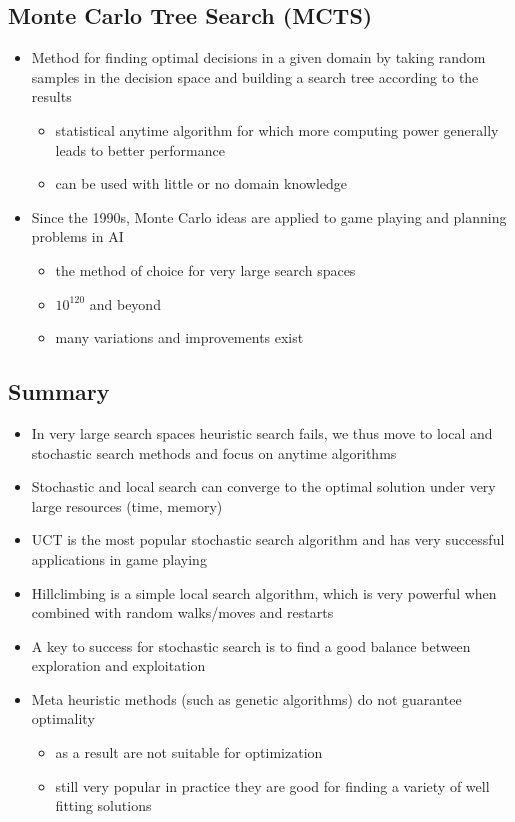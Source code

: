 \documentclass[conference, a4paper]{styles/acmsiggraph}
\begin{document}
    \subsection{Monte Carlo Tree Search (MCTS)}
        \begin{itemize}
            \item Method for finding optimal decisions in a given domain by taking random samples in the decision space and building a search tree according to the results
                \begin{itemize}
                    \item statistical anytime algorithm for which more computing power generally leads to better performance
                    \item can be used with little or no domain knowledge
                \end{itemize}
            \item Since the 1990s, Monte Carlo ideas are applied to game playing and planning problems in AI
                \begin{itemize}
                    \item the method of choice for very large search spaces
                    \item $10^{120}$ and beyond
                    \item many variations and improvements exist
                \end{itemize}
        \end{itemize}


    \subsection{Summary}
        \begin{itemize}
            \item In very large search spaces heuristic search fails, we thus move to local and stochastic search methods and focus on anytime algorithms
            \item Stochastic and local search can converge to the optimal solution under very large resources (time, memory)
            \item UCT is the most popular stochastic search algorithm and has very successful applications in game playing
            \item Hillclimbing is a simple local search algorithm, which is very powerful when combined with random walks/moves and restarts
            \item A key to success for stochastic search is to find a good balance between exploration and exploitation
            \item Meta heuristic methods (such as genetic algorithms) do not guarantee optimality
                \begin{itemize}
                    \item as a result are not suitable for optimization
                    \item still very popular in practice they are good for finding a variety of well fitting solutions
                \end{itemize}
        \end{itemize}
    
\end{document}
